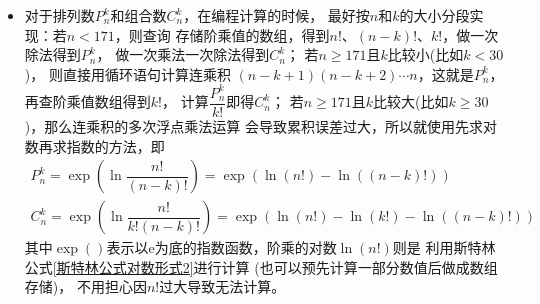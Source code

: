 \begin{itemize}[leftmargin=\inteval{\myitemleftmargin}pt,itemsep=
   \inteval{\myitemitempsep}pt,topsep=\inteval{\myitemtopsep}pt]
\item 对于排列数$P_n^k$和组合数$C_n^k$，在编程计算的时候，
最好按$n$和$k$的大小分段实现：若$n<171$，则查询
存储阶乘值的数组，得到$n!$、$(n-k)! $、$ k!$，做一次除法得到$P_n^k$，
做一次乘法一次除法得到$C_n^k$；
若$n\geq 171$且$k$比较小(比如$k<30$)，
则直接用循环语句计算连乘积
$(n-k+1)(n-k+2)\cdots n$，这就是$P_n^k$，再查阶乘值数组得到$k!$，
计算$\dfrac{P_n^k}{k!}$即得$C_n^k$；
若$n\geq 171$且$k$比较大(比如$k\geq 30$)，那么连乘积的多次浮点乘法运算
会导致累积误差过大，所以就使用先求对数再求指数的方法，即
\begin{gather*}
    P_n^k=\exp{\left(\ln \dfrac{n!}{(n-k)!}\right)}=\exp{(\ln(n!)-\ln((n-k)!))} \\
    C_n^k=\exp{\left(\ln \dfrac{n!}{k!(n-k)!}\right)}=\exp{(\ln(n!)-\ln(k!)-\ln((n-k)!))}
\end{gather*}
其中$\exp()$表示以e为底的指数函数，阶乘的对数$\ln(n!)$则是
利用斯特林公式\eqref{斯特林公式对数形式2}进行计算
(也可以预先计算一部分数值后做成数组存储)，
不用担心因$n!$过大导致无法计算。
    

\end{itemize}
